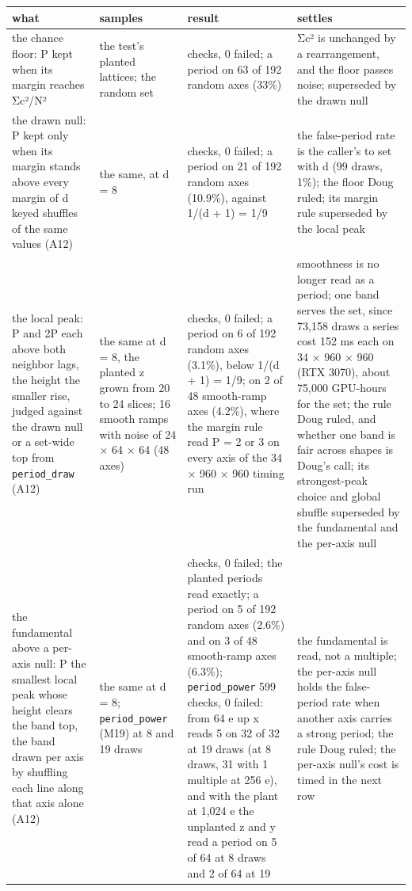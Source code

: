 {\footnotesize
\setlength{\tabcolsep}{6pt}
\begin{longtable}{>{\RaggedRight\arraybackslash}p{}>{\RaggedRight\arraybackslash}p{}>{\RaggedRight\arraybackslash}p{}>{\RaggedRight\arraybackslash}p{}}
\toprule
what & samples & result & settles \\
\midrule
\endhead
the chance floor: P kept when its margin reaches Σc²/N² & the test's planted lattices; the random set & 431 checks, 0 failed; a period on 63 of 192 random axes (33\%) & Σc² is unchanged by a rearrangement, and the floor passes noise; superseded by the drawn null \\
the drawn null: P kept only when its margin stands above every margin of d keyed shuffles of the same values (A12) & the same, at d = 8 & 502 checks, 0 failed; a period on 21 of 192 random axes (10.9\%), against 1/(d + 1) = 1/9 & the false-period rate is the caller's to set with d (99 draws, 1\%); the floor Doug ruled; its margin rule superseded by the local peak \\
the local peak: P and 2P each above both neighbor lags, the height the smaller rise, judged against the drawn null or a set-wide top from \texttt{period\_\allowbreak{}draw} (A12) & the same at d = 8, the planted z grown from 20 to 24 slices; 16 smooth ramps with noise of 24 × 64 × 64 (48 axes) & 700 checks, 0 failed; a period on 6 of 192 random axes (3.1\%), below 1/(d + 1) = 1/9; on 2 of 48 smooth-ramp axes (4.2\%), where the margin rule read P = 2 or 3 on every axis of the 34 × 960 × 960 timing run & smoothness is no longer read as a period; one band serves the set, since 73,158 draws a series cost 152 ms each on 34 × 960 × 960 (RTX 3070), about 75,000 GPU-hours for the set; the rule Doug ruled, and whether one band is fair across shapes is Doug's call; its strongest-peak choice and global shuffle superseded by the fundamental and the per-axis null \\
the fundamental above a per-axis null: P the smallest local peak whose height clears the band top, the band drawn per axis by shuffling each line along that axis alone (A12) & the same at d = 8; \texttt{period\_\allowbreak{}power} (M19) at 8 and 19 draws & 700 checks, 0 failed; the planted periods read exactly; a period on 5 of 192 random axes (2.6\%) and on 3 of 48 smooth-ramp axes (6.3\%); \texttt{period\_\allowbreak{}power} 599 checks, 0 failed: from 64 e up x reads 5 on 32 of 32 at 19 draws (at 8 draws, 31 with 1 multiple at 256 e), and with the plant at 1,024 e the unplanted z and y read a period on 5 of 64 at 8 draws and 2 of 64 at 19 & the fundamental is read, not a multiple; the per-axis null holds the false-period rate when another axis carries a strong period; the rule Doug ruled; the per-axis null's cost is timed in the next row \\

\end{longtable}}
